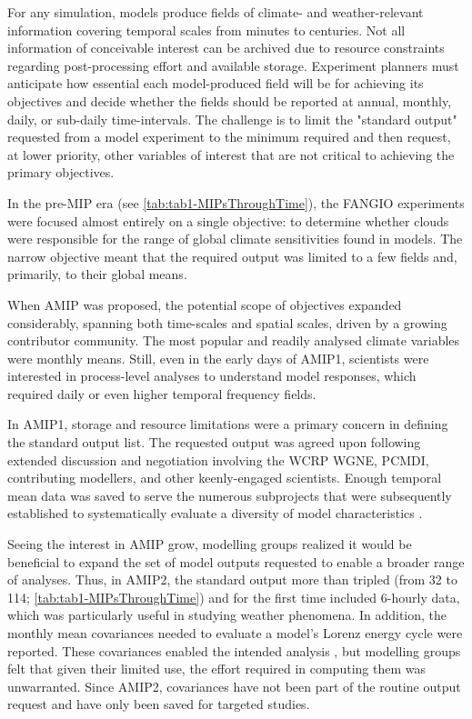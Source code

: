 \documentclass[gmd, preprint]{copernicus}
\begin{document}
For any simulation, models produce fields of climate- and weather-relevant information covering temporal scales from minutes to centuries. Not all information of conceivable interest can be archived due to resource constraints regarding post-processing effort and available storage. Experiment planners must anticipate how essential each model-produced field will be for achieving its objectives and decide whether the fields should be reported at annual, monthly, daily, or sub-daily time-intervals. The challenge is to limit the "standard output" requested from a model experiment to the minimum required and then request, at lower priority, other variables of interest that are not critical to achieving the primary objectives.

In the pre-MIP era (see \autoref{tab:tab1-MIPsThroughTime}), the FANGIO experiments were focused almost entirely on a single objective: to determine whether clouds were responsible for the range of global climate sensitivities found in models. The narrow objective meant that the required output was limited to a few fields and, primarily, to their global means.

When AMIP was proposed, the potential scope of objectives expanded considerably, spanning both time-scales and spatial scales, driven by a growing contributor community. The most popular and readily analysed climate variables were monthly means. Still, even in the early days of AMIP1, scientists were interested in process-level analyses to understand model responses, which required daily or even higher temporal frequency fields.

In AMIP1, storage and resource limitations were a primary concern in defining the standard output list. The requested output was agreed upon following extended discussion and negotiation involving the WCRP WGNE, PCMDI, contributing modellers, and other keenly-engaged scientists. Enough temporal mean data was saved to serve the numerous subprojects that were subsequently established to systematically evaluate a diversity of model characteristics \citep{gates_amip_1995}. 

Seeing the interest in AMIP grow, modelling groups realized it would be beneficial to expand the set of model outputs requested to enable a broader range of analyses. Thus, in AMIP2, the standard output more than tripled (from 32 to 114; \autoref{tab:tab1-MIPsThroughTime}) and for the first time included 6-hourly data, which was particularly useful in studying weather phenomena. In addition, the monthly mean covariances needed to evaluate a model's Lorenz energy cycle were reported. These covariances enabled the intended analysis \citep{boer_energy_2008}, but modelling groups felt that given their limited use, the effort required in computing them was unwarranted. Since AMIP2, covariances have not been part of the routine output request and have only been saved for targeted studies.
\end{document}

